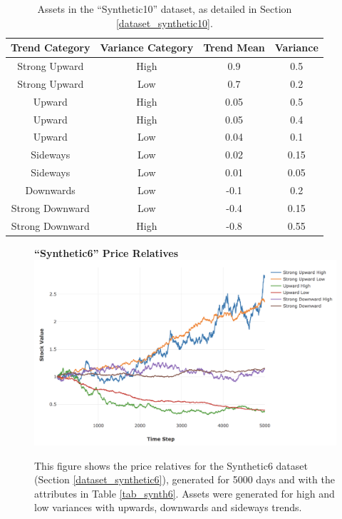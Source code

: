 \documentclass[a4paper,11pt,oneside]{article}
\theoremstyle{plain}
\theoremstyle{definition}
\begin{document}
	\begin{table}[H]
		\centering
		\small
		\begin{tabular}{|c|c|c|c|}
			\hline
			\textbf{Trend Category} &\textbf{Variance Category} & \textbf{Trend Mean} & \textbf{Variance}\\\hline	
			{Strong Upward} 		& {High} & {0.9} & {0.5} \\\hline
			{Strong Upward} 		& {Low} & {0.7} & {0.2} \\\hline
			{Upward} 					& {High} & {0.05} & {0.5} \\\hline
			{Upward} 					& {High} & {0.05} & {0.4} \\\hline
			{Upward} 					& {Low} & {0.04} & {0.1} \\\hline
			{Sideways} 					& {Low} & {0.02} & {0.15} \\\hline
			{Sideways}					& {Low} & {0.01} & {0.05} \\\hline
			{Downwards}				& {Low} & {-0.1} & {0.2} \\\hline
			{Strong Downward} 	& {Low} & {-0.4} & {0.15} \\\hline
			{Strong Downward}	& {High} & {-0.8} & {0.55} \\\hline
		\end{tabular}
		\newline\newline
		\caption{Assets in the ``Synthetic10'' dataset, as detailed in Section \ref{dataset_synthetic10}.}\label{tab_synth10}
	\end{table}
	
	\begin{figure}[H]
		\centering
		\textbf{``Synthetic6'' Price Relatives}
		\includegraphics[scale=0.45]{images/results/prices/synthetic6_prices.png} 
		\caption[Synthetic6 Price Relatives]{This figure shows the price relatives for the Synthetic6 dataset (Section \ref{dataset_synthetic6}), generated for 5000 days and with the attributes in Table \ref{tab_synth6}. Assets were generated for high and low variances with upwards, downwards and sideways trends.}
		\label{figure-synthetic6_prices}
	\end{figure}
	
\end{document}
